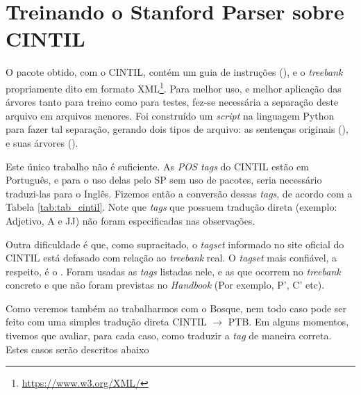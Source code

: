\section{Treinando o Stanford Parser sobre CINTIL}
\label{treinando_sp_cintil}

O pacote obtido, com o CINTIL, contém um guia de instruções (\cite{narrativeDescriptionCintil}), e o \textit{treebank} propriamente dito em formato XML\footnote{\url{https://www.w3.org/XML/}}. Para melhor uso, e melhor aplicação das árvores tanto para treino como para testes, fez-se necessária a separação deste arquivo em arquivos menores. Foi construído um \textit{script} na linguagem Python para fazer tal separação, gerando dois tipos de arquivo: as sentenças originais (), e suas árvores ().

Este único trabalho não é suficiente. As \textit{POS tags} do CINTIL estão em Português, e para o uso delas pelo SP sem uso de pacotes, seria necessário traduzi-las para o Inglês. Fizemos então a conversão dessas \textit{tags}, de acordo com a Tabela \ref{tab:tab_cintil}. Note que \textit{tags} que possuem tradução direta (exemplo: Adjetivo, A e JJ) não foram especificadas nas observações.

Outra dificuldade é que, como supracitado, o \textit{tagset} informado no site oficial do CINTIL está defasado com relação ao \textit{treebank} real. O \textit{tagset} mais confiável, a respeito, é o  \cite{cintil_handbook}. Foram usadas as \textit{tags} listadas nele, e as que ocorrem no \textit{treebank} concreto e que não foram previstas no \textit{Handbook} (Por exemplo, P’, C’ etc).

\begin{center}

\end{center}

Como veremos também ao trabalharmos com o Bosque, nem todo caso pode ser feito com uma simples tradução direta CINTIL $\rightarrow$ PTB. Em alguns momentos, tivemos que avaliar, para cada caso, como traduzir a \textit{tag} de maneira correta. Estes casos serão descritos abaixo
